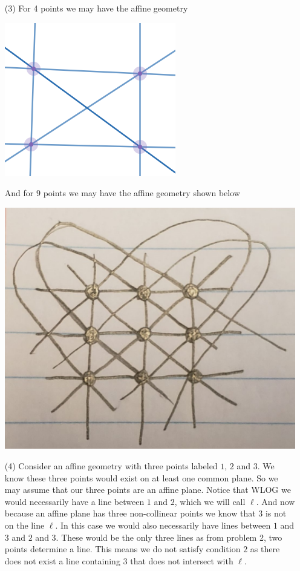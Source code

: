 \documentclass[12pt]{amsart}
\theoremstyle{definition}
\begin{document}
\begin{itemize}
\item[(3)]
For 4 points we may have the affine geometry
\begin{center}
\includegraphics[scale=.4]{affinegeom4pt.PNG}
\end{center}
And for $9$ points we may have the affine geometry shown below
\begin{center}
\includegraphics[scale=.15]{affinegeom9pt.jpg}
\end{center}

\item[(4)]
Consider an affine geometry with three points labeled $1$, $2$ and $3$. We know these three points would exist on at least one common plane. So we may assume that our three points are an affine plane. Notice that WLOG we would necessarily have a line between $1$ and $2$, which we will call $\ell$. And now because an affine plane has three non-collinear points we know that $3$ is not on the line $\ell$. In this case we would also necessarily have lines between $1$ and $3$ and $2$ and $3$. These would be the only three lines as from problem 2, two points determine a line. This means we do not satisfy condition $2$ as there does not exist a line containing $3$ that does not intersect with $\ell$.\\


\end{itemize}
\end{document}
